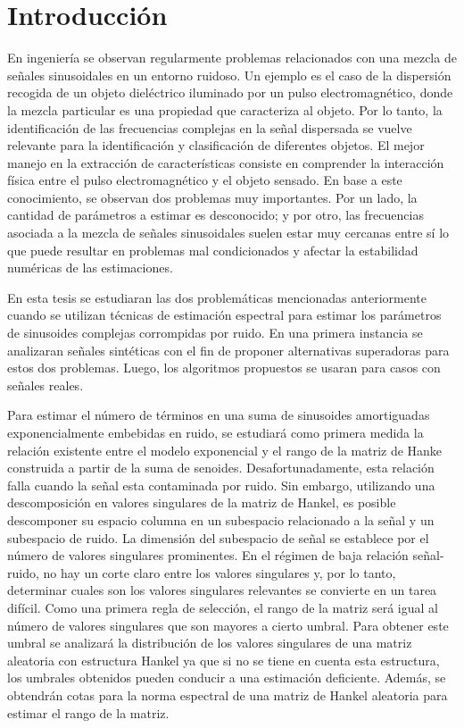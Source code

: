 \chapter{Introducción}\label{chap:Introduccion}


En ingeniería se observan regularmente problemas relacionados con una mezcla de señales sinusoidales en un entorno ruidoso. Un ejemplo es el caso de la dispersión recogida de un objeto dieléctrico iluminado por un pulso electromagnético, donde la mezcla particular es una propiedad que caracteriza al objeto. Por lo tanto, la identificación de las frecuencias complejas en la señal dispersada se vuelve relevante para la identificación y clasificación de diferentes objetos. El mejor manejo en la extracción de características consiste en comprender la interacción física entre el pulso electromagnético y el objeto sensado. En base a este conocimiento, se observan dos problemas muy importantes. Por un lado, la cantidad de parámetros a estimar es desconocido; y por otro, las frecuencias asociada a la mezcla de señales sinusoidales suelen estar muy cercanas entre sí lo que puede resultar en problemas mal condicionados y afectar la estabilidad numéricas de las estimaciones.

En esta tesis se estudiaran las dos problemáticas mencionadas anteriormente cuando se utilizan técnicas de estimación espectral para estimar los parámetros de sinusoides complejas corrompidas por ruido. En una primera instancia se analizaran señales sintéticas con el fin de proponer alternativas superadoras para estos dos problemas. Luego, los algoritmos propuestos se usaran para casos con señales reales.

Para estimar el número de términos en una suma de sinusoides amortiguadas exponencialmente embebidas en ruido, se estudiará como primera medida la relación existente entre el modelo exponencial y el rango de la matriz de Hanke construida a partir de la suma de senoides. Desafortunadamente, esta relación falla cuando la señal esta contaminada por ruido. Sin embargo, utilizando una descomposición en valores singulares de la matriz de Hankel, es posible descomponer su espacio columna en un subespacio relacionado a la señal y un subespacio de ruido. La dimensión del subespacio de señal se establece por el número de valores singulares prominentes. En el régimen de baja relación señal-ruido, no hay un corte claro entre los valores singulares y, por lo tanto, determinar cuales son los valores singulares relevantes se convierte en un tarea difícil. Como una primera regla de selección, el rango de la matriz será igual al número de valores singulares que son mayores a cierto umbral. Para obtener este umbral se analizará la distribución de los valores singulares de una matriz aleatoria con estructura Hankel ya que si no se tiene en cuenta esta estructura, los umbrales obtenidos pueden conducir a una estimación deficiente. Además, se obtendrán cotas para la norma espectral de una matriz de Hankel aleatoria para estimar el rango de la matriz.

